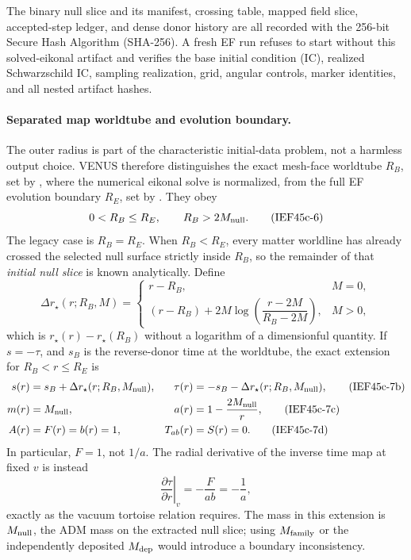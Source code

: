 The binary null slice and its manifest, crossing table, mapped field slice,
accepted-step ledger, and dense donor history are all recorded with the
256-bit Secure Hash Algorithm (SHA-256).  A
fresh EF run refuses to start without this solved-eikonal artifact and verifies
the base initial condition (IC), realized Schwarzschild IC, sampling
realization, grid, angular
controls, marker identities, and all nested artifact hashes.

\paragraph{Separated map worldtube and evolution boundary.}
The outer radius is part of the characteristic initial-data problem, not a
harmless output choice.  VENUS therefore distinguishes the exact mesh-face
worldtube \(R_B\), set by , where the numerical
eikonal solve is normalized, from the full EF evolution boundary \(R_E\), set
by .  They obey
\[
 0<R_B\leq R_E,\qquad R_B>2M_{\rm null}.                \tag{IEF45c-6}
\]
The legacy case is \(R_B=R_E\).  When \(R_B<R_E\), every matter worldline has
already crossed the selected null surface strictly inside \(R_B\), so the
remainder of that \emph{initial null slice} is known analytically.  Define
\[
 \Delta r_\star(r;R_B,M)=
 \begin{cases}
 r-R_B, &M=0,\\[2pt]
 (r-R_B)+2M\log\!\left(\dfrac{r-2M}{R_B-2M}\right),&M>0,
 \end{cases}                                           \tag{IEF45c-7a}
\]
which is \(r_\star(r)-r_\star(R_B)\) without a logarithm of a dimensionful
quantity.  If \(s=-\tau\), and \(s_B\) is the reverse-donor time at the
worldtube, the exact extension for \(R_B<r\leq R_E\) is
\begin{align}
 s(r)&=s_B+\Delta r_\star(r;R_B,M_{\rm null}),&
 \tau(r)&=-s_B-\Delta r_\star(r;R_B,M_{\rm null}),
                                                               \tag{IEF45c-7b}\\
 m(r)&=M_{\rm null},&
 a(r)&=1-\frac{2M_{\rm null}}r,                       \tag{IEF45c-7c}\\
 A(r)&=F(r)=b(r)=1,&
 T_{ab}(r)&=S(r)=0.                                    \tag{IEF45c-7d}
\end{align}
In particular, \(F=1\), not \(1/a\).  The radial derivative of the inverse
time map at fixed \(v\) is instead
\[
 \left.\frac{\partial\tau}{\partial r}\right|_v
 =-\frac{F}{ab}=-\frac1a,                              \tag{IEF45c-7e}
\]
exactly as the vacuum tortoise relation requires.  The mass in this extension
is \(M_{\rm null}\), the ADM mass on the extracted null slice; using
\(M_{\rm family}\) or the independently deposited \(M_{\rm dep}\) would
introduce a boundary inconsistency.

